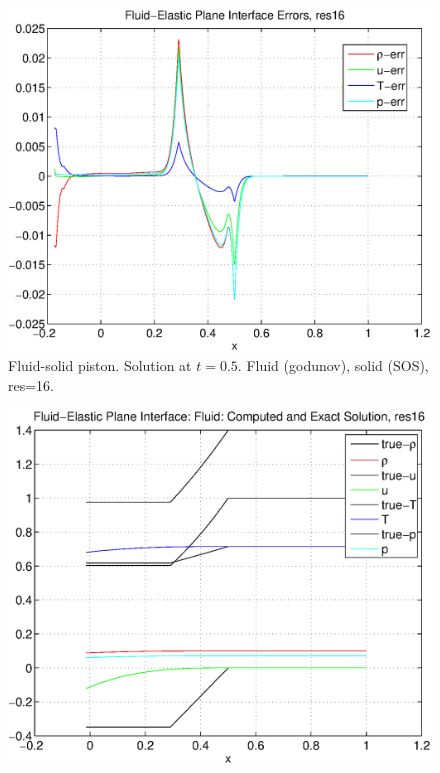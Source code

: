 {\begin{figure}[hbt]
\includegraphics[width=\fwidth]{fluidElastic_planeInterfaceErr_res16.eps}
\caption{Fluid-solid piston. Solution at $t=0.5$. Fluid (godunov), solid (SOS), res=16.}
\label{fig:fluidSolidPistonSOS16}
\end{figure}
\begin{figure}[hbt]
\includegraphics[width=\fwidth]{fluidElastic_planeInterfacegFluid_res16.eps}

\end{figure}}
